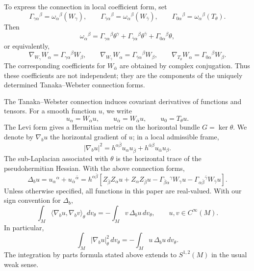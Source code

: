\documentclass[11pt]{article}
\numberwithin{equation}{section}
\numberwithin{equation}{section}
\begin{document}
	To express the connection in local coefficient form, set
\[
\Gamma_{\gamma\alpha}{}^\beta
=
\omega_\alpha{}^\beta(W_\gamma),
\qquad
\Gamma_{\bar\gamma\alpha}{}^\beta
=
\omega_\alpha{}^\beta(W_{\bar\gamma}),
\qquad
\Gamma_{0\alpha}{}^\beta
=
\omega_\alpha{}^\beta(T_\theta).
\]
Then
\[
\omega_\alpha{}^\beta
=
\Gamma_{\gamma\alpha}{}^\beta\theta^\gamma
+
\Gamma_{\bar\gamma\alpha}{}^\beta\theta^{\bar\gamma}
+
\Gamma_{0\alpha}{}^\beta\theta,
\]
or equivalently,
\[
\nabla_{W_\gamma}W_\alpha
=
\Gamma_{\gamma\alpha}{}^\beta W_\beta,
\qquad
\nabla_{W_{\bar\gamma}}W_\alpha
=
\Gamma_{\bar\gamma\alpha}{}^\beta W_\beta,
\qquad
\nabla_{T_\theta}W_\alpha
=
\Gamma_{0\alpha}{}^\beta W_\beta.
\]
The corresponding coefficients for \(W_{\bar\alpha}\) are obtained by complex conjugation. Thus these coefficients are not independent; they are the components of the uniquely determined Tanaka--Webster connection forms.
	
	The Tanaka--Webster connection induces covariant derivatives of functions and tensors. For a smooth function \(u\), we write
	\[
	u_\alpha=W_\alpha u,\qquad u_{\bar\alpha}=W_{\bar\alpha}u,\qquad u_0=T_\theta u.
	\]
	The Levi form gives a Hermitian metric on the horizontal bundle \(G=\ker\theta\). We denote by \(\nabla_b u\) the horizontal gradient of \(u\); in a local admissible frame,
	\[
	|\nabla_b u|^2 =h^{\alpha\bar\beta}u_\alpha u_{\bar\beta} +h^{\bar\alpha\beta}u_{\bar\alpha}u_\beta .
	\]
	The sub-Laplacian associated with \(\theta\) is the horizontal trace of the pseudohermitian Hessian. With the above connection forms,
	\[
	\Delta_b u =u_\alpha{}^\alpha+u_{\bar\alpha}{}^{\bar\alpha} =h^{\alpha\bar\beta}[ Z_{\bar\beta}Z_\alpha u+Z_\alpha Z_{\bar\beta}u -\Gamma_{\bar\beta\alpha}{}^\gamma W_\gamma u-\Gamma_{\alpha\bar\beta}{}^{\bar\gamma}
	W_{\bar\gamma}u ].
	\]
	Unless otherwise specified, all functions in this paper are real-valued. With our sign convention for \(\Delta_b\),
	\[
	\int_M \langle \nabla_bu,\nabla_bv\rangle_\theta\,dv_\theta = -\int_M v\,\Delta_bu\,dv_\theta, \qquad u,v\in C^\infty(M).
	\]
	In particular,
	\[
	\int_M |\nabla_bu|_\theta^2\,dv_\theta = -\int_M u\,\Delta_bu\,dv_\theta .
	\]
	The integration by parts formula stated above extends to \(S^{1,2}(M)\) in the usual weak sense.
	
\end{document}
